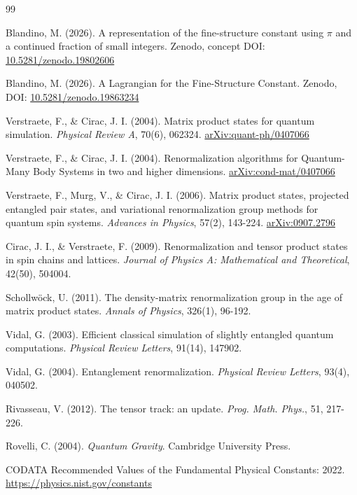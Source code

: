 \documentclass[12pt]{article}
\begin{document}
\begin{thebibliography}{99}

Blandino, M. (2026). A representation of the fine-structure constant using $\pi$ and
a continued fraction of small integers.
Zenodo, concept DOI: \href{https://doi.org/10.5281/zenodo.19802606}{10.5281/zenodo.19802606}

Blandino, M. (2026). A Lagrangian for the Fine-Structure Constant.
Zenodo, DOI: \href{https://doi.org/10.5281/zenodo.19863234}{10.5281/zenodo.19863234}

Verstraete, F., \& Cirac, J. I. (2004). Matrix product states for quantum simulation.
\textit{Physical Review A}, 70(6), 062324.
\href{https://arxiv.org/abs/quant-ph/0407066}{arXiv:quant-ph/0407066}

Verstraete, F., \& Cirac, J. I. (2004). Renormalization algorithms for Quantum-Many Body
Systems in two and higher dimensions.
\href{https://arxiv.org/abs/cond-mat/0407066}{arXiv:cond-mat/0407066}

Verstraete, F., Murg, V., \& Cirac, J. I. (2006). Matrix product states, projected
entangled pair states, and variational renormalization group methods for quantum spin
systems. \textit{Advances in Physics}, 57(2), 143-224.
\href{https://arxiv.org/abs/0907.2796}{arXiv:0907.2796}

Cirac, J. I., \& Verstraete, F. (2009). Renormalization and tensor product states in
spin chains and lattices. \textit{Journal of Physics A: Mathematical and Theoretical},
42(50), 504004.

Schollwöck, U. (2011). The density-matrix renormalization group in the age of matrix
product states. \textit{Annals of Physics}, 326(1), 96-192.

Vidal, G. (2003). Efficient classical simulation of slightly entangled quantum
computations. \textit{Physical Review Letters}, 91(14), 147902.

Vidal, G. (2004). Entanglement renormalization. \textit{Physical Review Letters},
93(4), 040502.

Rivasseau, V. (2012). The tensor track: an update. \textit{Prog. Math. Phys.}, 51, 217-226.

Rovelli, C. (2004). \textit{Quantum Gravity}. Cambridge University Press.

CODATA Recommended Values of the Fundamental Physical Constants: 2022.
\url{https://physics.nist.gov/constants}

\end{thebibliography}
\end{document}
